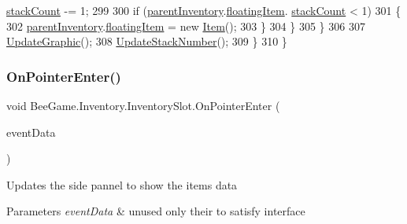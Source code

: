 \begin{DoxyCode}
      \hyperlink{struct_bee_game_1_1_items_1_1_item_aaa169917b0e0f8472f20398d5d448388}{stackCount} -= 1;
299 
300                         \textcolor{keywordflow}{if} (\hyperlink{class_bee_game_1_1_inventory_1_1_inventory_slot_a06c37b35f2512ee2f0652a93129808e4}{parentInventory}.\hyperlink{class_bee_game_1_1_inventory_1_1_inventory_base_aa018ec0acd2aa39dd922f0a1bc1411e6}{floatingItem}.
      \hyperlink{struct_bee_game_1_1_items_1_1_item_aaa169917b0e0f8472f20398d5d448388}{stackCount} < 1)
301                         \{
302                             \hyperlink{class_bee_game_1_1_inventory_1_1_inventory_slot_a06c37b35f2512ee2f0652a93129808e4}{parentInventory}.\hyperlink{class_bee_game_1_1_inventory_1_1_inventory_base_aa018ec0acd2aa39dd922f0a1bc1411e6}{floatingItem} = \textcolor{keyword}{new} 
      \hyperlink{struct_bee_game_1_1_items_1_1_item}{Item}();
303                         \}
304                     \}
305                 \}
306 
307                 \hyperlink{class_bee_game_1_1_inventory_1_1_inventory_slot_abe33997cbde05772253494f20f949483}{UpdateGraphic}();
308                 \hyperlink{class_bee_game_1_1_inventory_1_1_inventory_slot_a58cc9b63c6af1dceccee17210b73f70d}{UpdateStackNumber}();
309             \}
310         \}
\end{DoxyCode}
\mbox{\label{class_bee_game_1_1_inventory_1_1_inventory_slot_a471790f0d1eb55a483b0a530c6371c09}} 
\subsubsection{\texorpdfstring{On\+Pointer\+Enter()}{OnPointerEnter()}}
{\footnotesize\ttfamily void Bee\+Game.\+Inventory.\+Inventory\+Slot.\+On\+Pointer\+Enter (\begin{DoxyParamCaption}\item[{Pointer\+Event\+Data}]{event\+Data }\end{DoxyParamCaption})}



Updates the side pannel to show the items data 


\begin{DoxyParams}{Parameters}
{\em event\+Data} & unused only their to satisfy interface\\
\hline
\end{DoxyParams}


